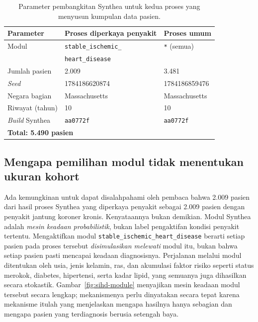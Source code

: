 \begin{table}[h]
\centering
\caption{Parameter pembangkitan Synthea untuk kedua proses yang menyusun kumpulan data pasien.}
\label{tab:generation}
\begin{tabular}{lll}
\hline
\textbf{Parameter} & \textbf{Proses diperkaya penyakit} & \textbf{Proses umum} \\
\hline
Modul                & \texttt{stable\_ischemic\_} & \texttt{*} (semua) \\
                     & \texttt{heart\_disease} & \\
Jumlah pasien        & 2{.}009 & 3{.}481 \\
\emph{Seed}          & 1784186620874 & 1784186859476 \\
Negara bagian        & Massachusetts & Massachusetts \\
Riwayat (tahun)      & 10 & 10 \\
\emph{Build} Synthea & \texttt{aa0772f} & \texttt{aa0772f} \\
\hline
\multicolumn{3}{l}{\textbf{Total: 5{.}490 pasien}} \\
\hline
\end{tabular}
\end{table}

\subsection{Mengapa pemilihan modul tidak menentukan ukuran kohort}
\label{sec:module-yield}
Ada kemungkinan untuk dapat disalahpahami oleh pembaca bahwa 2{.}009 pasien dari hasil proses Synthea yang diperkaya penyakit sebagai 2{.}009
pasien dengan penyakit jantung koroner kronis. Kenyataannya bukan demikian. Modul Synthea
adalah \emph{mesin keadaan probabilistik}, bukan label pengaktifan kondisi penyakit tertentu. Mengaktifkan modul
\texttt{stable\_ischemic\_heart\_disease} berarti setiap pasien pada proses tersebut
\emph{disimulasikan melewati} modul itu, bukan bahwa setiap pasien pasti mencapai keadaan
diagnosisnya. Perjalanan melalui modul ditentukan oleh usia, jenis kelamin, ras, dan akumulasi
faktor risiko seperti status merokok, diabetes, hipertensi, serta kadar lipid, yang semuanya
juga dihasilkan secara stokastik. Gambar~\ref{fig:sihd-module} menyajikan mesin keadaan modul
tersebut secara lengkap; mekanismenya perlu dinyatakan secara tepat karena mekanisme itulah
yang menjelaskan mengapa hasilnya hanya sebagian dan mengapa pasien yang terdiagnosis berusia
setengah baya.

